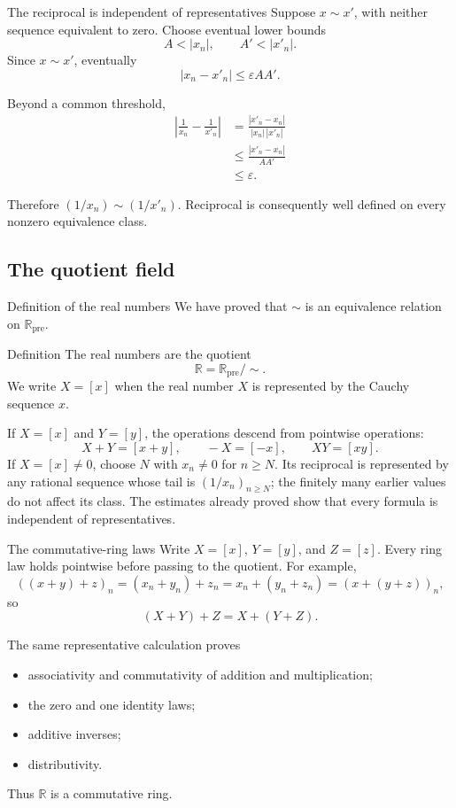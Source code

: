 \documentclass[aspectratio=169,11pt]{beamer}
\newcommand{\R}{\mathbb R}
\begin{document}
\begin{frame}{The reciprocal is independent of representatives}
  Suppose \(x\sim x'\), with neither sequence equivalent to zero.  Choose
  eventual lower bounds
  \[
    A<|x_n|,
    \qquad
    A'<|x'_n|.
  \]
  Since \(x\sim x'\), eventually
  \[
    |x_n-x'_n|\le\varepsilon AA'.
  \]

  Beyond a common threshold,
  \begin{align*}
    \left|\frac1{x_n}-\frac1{x'_n}\right|
      &=\frac{|x'_n-x_n|}{|x_n|\,|x'_n|}\\
      &\le\frac{|x'_n-x_n|}{AA'}\\
      &\le\varepsilon.
  \end{align*}

  Therefore \((1/x_n)\sim(1/x'_n)\).  Reciprocal is consequently well
  defined on every nonzero equivalence class.
\end{frame}

\subsection{The quotient field}

\begin{frame}{Definition of the real numbers}
  We have proved that \(\sim\) is an equivalence relation on
  \(\R_{\mathrm{pre}}\).

  \begin{block}{Definition}
    The real numbers are the quotient
    \[
      \boxed{\R=\R_{\mathrm{pre}}/{\sim}.}
    \]
    We write \(X=[x]\) when the real number \(X\) is represented by the
    Cauchy sequence \(x\).
  \end{block}

  If \(X=[x]\) and \(Y=[y]\), the operations descend from pointwise
  operations:
  \[
    X+Y=[x+y],
    \qquad
    -X=[-x],
    \qquad
    XY=[xy].
  \]
  If \(X=[x]\ne0\), choose \(N\) with \(x_n\ne0\) for \(n\ge N\).  Its
  reciprocal is represented by any rational sequence whose tail is
  \((1/x_n)_{n\ge N}\); the finitely many earlier values do not affect its
  class.  The estimates already proved show that every formula is independent
  of representatives.
\end{frame}

\begin{frame}{The commutative-ring laws}
  Write \(X=[x]\), \(Y=[y]\), and \(Z=[z]\).  Every ring law holds pointwise
  before passing to the quotient.  For example,
  \[
    ((x+y)+z)_n=(x_n+y_n)+z_n
      =x_n+(y_n+z_n)=(x+(y+z))_n,
  \]
  so
  \[
    (X+Y)+Z=X+(Y+Z).
  \]

  The same representative calculation proves
  \begin{itemize}
    \item associativity and commutativity of addition and multiplication;
    \item the zero and one identity laws;
    \item additive inverses;
    \item distributivity.
  \end{itemize}

  Thus \(\R\) is a commutative ring.
\end{frame}
\end{document}
